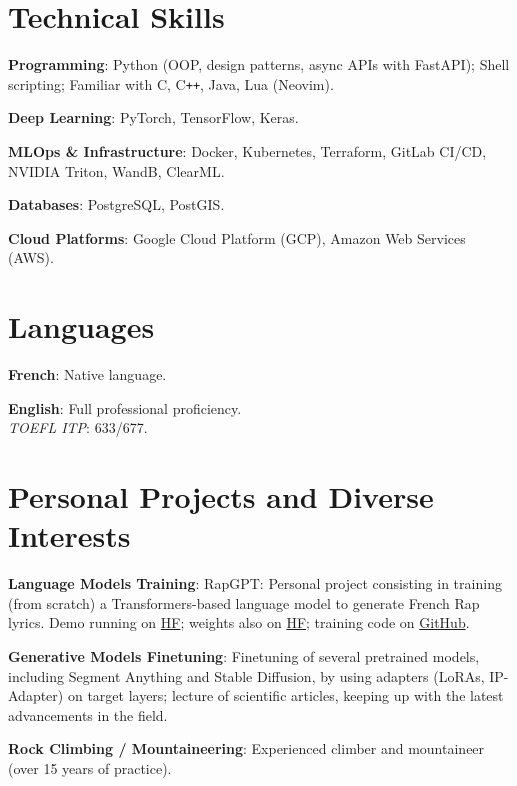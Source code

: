 \documentclass[letterpaper,10pt]{article}
\newcommand{\resumeItem}[2]{
  \item\small{
    \textbf{#1}{: #2\vspace{-0.8pt}}
  }
}
\def\Plus{\texttt{+}}
\newcommand{\resumeSubItem}[2]{
    \small{\resumeItem{#1}{#2}\vspace{-4pt}}
	}
\newcommand{\resumeSubHeadingListStart}{\begin{itemize}[leftmargin=*]}
\newcommand{\resumeSubHeadingListEnd}{\end{itemize}}
\begin{document}
\begin{minipage}[t]{0.65\linewidth}
    \section{Technical Skills}
    \resumeSubHeadingListStart
    \resumeSubItem{Programming}{Python (OOP, design patterns, async APIs with FastAPI); Shell scripting; Familiar with C, C\Plus\Plus, Java, Lua (Neovim).}
    \resumeSubItem{Deep Learning}{PyTorch, TensorFlow, Keras.}
    \resumeSubItem{MLOps \& Infrastructure}{Docker, Kubernetes, Terraform, GitLab CI/CD, NVIDIA Triton, WandB, ClearML.}
    \resumeSubItem{Databases}{PostgreSQL, PostGIS.}
    \resumeSubItem{Cloud Platforms}{Google Cloud Platform (GCP), Amazon Web Services (AWS).}
    \resumeSubHeadingListEnd
    \end{minipage}
\hfill
\begin{minipage}[t]{0.3\linewidth}
    \section{Languages}
    \resumeSubHeadingListStart
    \resumeSubItem{French}{Native language.}
    \resumeSubItem{English}{Full professional proficiency. \\ \emph{TOEFL ITP}: 633/677.}
    \resumeSubHeadingListEnd
\end{minipage}



\section{Personal Projects and Diverse Interests}
\vspace{0.5mm}
\begin{minipage}[t]{0.9865\textwidth}
\resumeSubHeadingListStart
\resumeSubItem{Language Models Training}{RapGPT: Personal project consisting in training (from scratch) a Transformers-based language model to generate French Rap lyrics. 
Demo running on \href{https://huggingface.co/spaces/hugojarkoff/rapGPT}{HF}; weights also on \href{https://huggingface.co/hugojarkoff/rapGPT}{HF}; training code on \href{https://github.com/hugojarkoff/rapGPT}{GitHub}.}
\resumeSubItem{Generative Models Finetuning}{Finetuning of several pretrained models, including Segment Anything and Stable Diffusion, by using adapters (LoRAs, IP-Adapter) on target layers; lecture of scientific articles, keeping up with the latest advancements in the field.}
\resumeSubItem{Rock Climbing / Mountaineering}{Experienced climber and mountaineer (over 15 years of practice).}
\resumeSubHeadingListEnd
\end{minipage}







\end{document}
